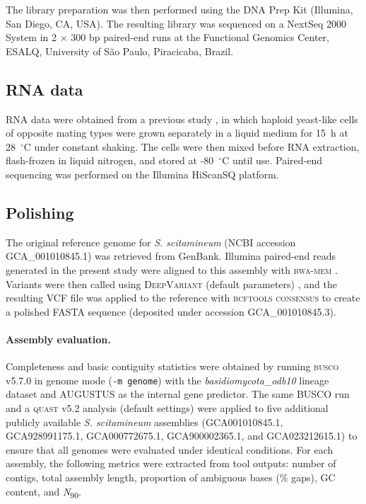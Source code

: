 \documentclass[Journal,letterpaper]{ascelike-new}
\begin{document}
The library preparation was then performed using the DNA Prep Kit (Illumina, San Diego, CA, USA). The resulting library was sequenced on a NextSeq 2000 System in 2 $\times$ 300 bp paired-end runs at the Functional Genomics Center, ESALQ, University of São Paulo, Piracicaba, Brazil.

\subsection*{RNA data}

RNA data were obtained from a previous study \cite{sscita2015}, in which haploid yeast-like cells of opposite mating types were grown separately in a liquid medium for 15~h at 28~$^{\circ}$C under constant shaking. The cells were then mixed before RNA extraction, flash-frozen in liquid nitrogen, and stored at -80~$^{\circ}$C until use. Paired-end sequencing was performed on the Illumina HiScanSQ platform.

\subsection*{Polishing}

The original reference genome for \textit{S. scitamineum} (NCBI accession GCA\_001010845.1) \cite{sscita2015} was retrieved from GenBank. Illumina paired-end reads generated in the present study were aligned to this assembly with \textsc{bwa-mem} \cite{bwamem}. Variants were then called using \textsc{DeepVariant} (default parameters) \cite{deepvariant2018}, and the resulting VCF file was applied to the reference with \textsc{bcftools consensus} \cite{samtools} to create a polished FASTA sequence (deposited under accession GCA\_001010845.3).

\paragraph{Assembly evaluation.} Completeness and basic contiguity statistics were obtained by running \textsc{busco} v5.7.0 \cite{busco} in genome mode (\texttt{-m genome}) with the \textit{basidiomycota\_odb10} lineage dataset and \textsc{AUGUSTUS} as the internal gene predictor. The same BUSCO run and a \textsc{quast} v5.2 analysis (default settings) were applied to five additional publicly available \textit{S. scitamineum} assemblies (GCA001010845.1, GCA928991175.1, GCA000772675.1, GCA900002365.1, and GCA023212615.1) to ensure that all genomes were evaluated under identical conditions. For each assembly, the following metrics were extracted from tool outputs: number of contigs, total assembly length, proportion of ambiguous bases (\% gaps), GC content, and \textit{N}\textsubscript{90}.
\end{document}
